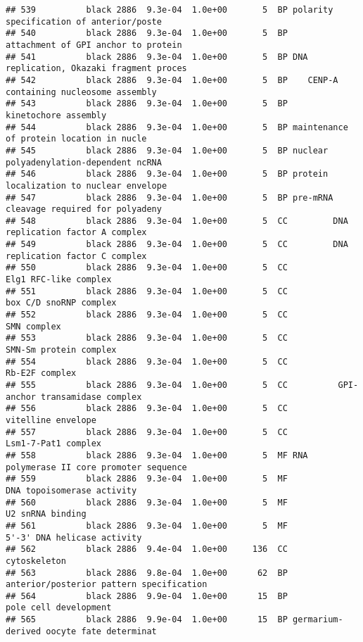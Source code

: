 \documentclass[]{article}
\begin{document}
\begin{verbatim}
## 539          black 2886  9.3e-04  1.0e+00       5  BP polarity specification of anterior/poste
## 540          black 2886  9.3e-04  1.0e+00       5  BP      attachment of GPI anchor to protein
## 541          black 2886  9.3e-04  1.0e+00       5  BP DNA replication, Okazaki fragment proces
## 542          black 2886  9.3e-04  1.0e+00       5  BP    CENP-A containing nucleosome assembly
## 543          black 2886  9.3e-04  1.0e+00       5  BP                     kinetochore assembly
## 544          black 2886  9.3e-04  1.0e+00       5  BP maintenance of protein location in nucle
## 545          black 2886  9.3e-04  1.0e+00       5  BP nuclear polyadenylation-dependent ncRNA 
## 546          black 2886  9.3e-04  1.0e+00       5  BP protein localization to nuclear envelope
## 547          black 2886  9.3e-04  1.0e+00       5  BP pre-mRNA cleavage required for polyadeny
## 548          black 2886  9.3e-04  1.0e+00       5  CC         DNA replication factor A complex
## 549          black 2886  9.3e-04  1.0e+00       5  CC         DNA replication factor C complex
## 550          black 2886  9.3e-04  1.0e+00       5  CC                    Elg1 RFC-like complex
## 551          black 2886  9.3e-04  1.0e+00       5  CC                   box C/D snoRNP complex
## 552          black 2886  9.3e-04  1.0e+00       5  CC                              SMN complex
## 553          black 2886  9.3e-04  1.0e+00       5  CC                   SMN-Sm protein complex
## 554          black 2886  9.3e-04  1.0e+00       5  CC                           Rb-E2F complex
## 555          black 2886  9.3e-04  1.0e+00       5  CC          GPI-anchor transamidase complex
## 556          black 2886  9.3e-04  1.0e+00       5  CC                       vitelline envelope
## 557          black 2886  9.3e-04  1.0e+00       5  CC                      Lsm1-7-Pat1 complex
## 558          black 2886  9.3e-04  1.0e+00       5  MF RNA polymerase II core promoter sequence
## 559          black 2886  9.3e-04  1.0e+00       5  MF               DNA topoisomerase activity
## 560          black 2886  9.3e-04  1.0e+00       5  MF                         U2 snRNA binding
## 561          black 2886  9.3e-04  1.0e+00       5  MF              5'-3' DNA helicase activity
## 562          black 2886  9.4e-04  1.0e+00     136  CC                             cytoskeleton
## 563          black 2886  9.8e-04  1.0e+00      62  BP anterior/posterior pattern specification
## 564          black 2886  9.9e-04  1.0e+00      15  BP                    pole cell development
## 565          black 2886  9.9e-04  1.0e+00      15  BP germarium-derived oocyte fate determinat

\end{verbatim}
\end{document}
